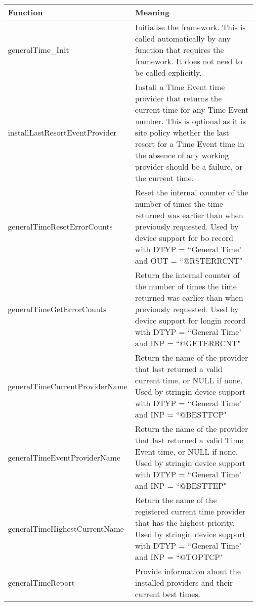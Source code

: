 \begin{center}
\begin{longtable}{p{2.0in}p{4.25in}}
\textbf{Function} & \textbf{Meaning}\\
\hline
\index{generalTime\_Init}
generalTime\_Init &
Initialise the framework.
This is called automatically by any function that requires the framework.
It does not need to be called explicitly.\\

\index{installLastResortEventProvider}
installLastResortEventProvider &
Install a Time Event time provider that returns the current time for any Time Event number.
This is optional as it is site policy whether the last resort for a Time Event time in the absence of any working provider should be a failure, or the current time.\\

\index{generalTimeResetErrorCounts}
generalTimeResetErrorCounts &
Reset the internal counter of the number of times the time returned was earlier than when previously requested.
Used by device support for bo record with DTYP = ``General Time" and OUT = ``@RSTERRCNT"\\

\index{generalTimeGetErrorCounts}
generalTimeGetErrorCounts &
Return the internal counter of the number of times the time returned was earlier than when previously requested.
Used by device support for longin record with DTYP = ``General Time" and INP = ``@GETERRCNT"\\

\index{generalTimeCurrentProviderName}
generalTimeCurrentProviderName &
Return the name of the provider that last returned a valid current time, or NULL if none.
Used by stringin device support with DTYP = ``General Time" and INP = ``@BESTTCP"\\

\index{generalTimeEventProviderName}
generalTimeEventProviderName &
Return the name of the provider that last returned a valid Time Event time, or NULL if none.
Used by stringin device support with DTYP = ``General Time" and INP = ``@BESTTEP"\\

\index{generalTimeHighestCurrentName}
generalTimeHighestCurrentName &
Return the name of the registered current time provider that has the highest priority.
Used by stringin device support with DTYP = ``General Time" and INP = ``@TOPTCP"\\

\index{generalTimeReport}
generalTimeReport &
Provide information about the installed providers and their current best times.
\end{longtable}

\end{center}


